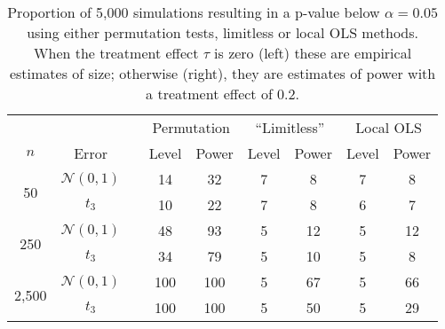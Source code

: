 
\begin{table}
\centering
\footnotesize
\begin{tabular}{cc|ccccccc}
\hline

&&& \multicolumn{ 2 }{c}{Permutation}&\multicolumn{ 2 }{c}{``Limitless''}&\multicolumn{ 2 }{c}{Local OLS}\\
$n$& Error && Level&Power&Level&Power&Level&Power \\
\hline
\hline
\multirow{2}{*}{ 50 } & $\mathcal{N}(0,1)$ &&14&32&7&8&7&8 \\
 & $t_3$ &&10&22&7&8&6&7 \\
\hline
\multirow{2}{*}{ 250 } & $\mathcal{N}(0,1)$ &&48&93&5&12&5&12 \\
 & $t_3$ &&34&79&5&10&5&8 \\
\hline
\multirow{2}{*}{ 2,500 } & $\mathcal{N}(0,1)$ &&100&100&5&67&5&66 \\
 & $t_3$ &&100&100&5&50&5&29 \\
\hline
\end{tabular}
\caption{Proportion of  5,000  simulations resulting in a p-value below $\alpha=0.05$
using either permutation tests, limitless or local OLS methods. When the
treatment effect $\tau$ is zero (left) these are empirical estimates of size;
otherwise (right), they are estimates of power with a treatment effect of 0.2.}
\label{tab:level}\end{table}
